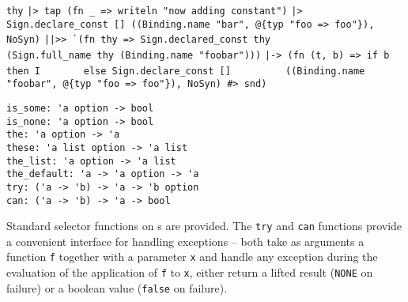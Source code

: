 \begin{isabellebody}
\begin{isamarkuptext}
  \smallskip\begin{mldecls}
\verb|thy|\isasep\isanewline%
\verb||\verb,|,\verb|> tap (fn _ => writeln "now adding constant")|\isasep\isanewline%
\verb||\verb,|,\verb|> Sign.declare_const [] ((Binding.name "bar", @{typ "foo => foo"}), NoSyn)|\isasep\isanewline%
\verb||\verb,|,\verb||\verb,|,\verb|>> `(fn thy => Sign.declared_const thy|\isasep\isanewline%
\verb|         (Sign.full_name thy (Binding.name "foobar")))|\isasep\isanewline%
\verb||\verb,|,\verb|-> (fn (t, b) => if b then I|\isasep\isanewline%
\verb|       else Sign.declare_const []|\isasep\isanewline%
\verb|         ((Binding.name "foobar", @{typ "foo => foo"}), NoSyn) #> snd)|\isasep\isanewline%

  \end{mldecls}%
\end{isamarkuptext}%
\isamarkuptrue%
%
\isamarkuptrue%
%
\isadelimmlref
%
\endisadelimmlref
%
\isatagmlref
%
\begin{isamarkuptext}%
\begin{mldecls}
  \verb|is_some: 'a option -> bool| \\
  \verb|is_none: 'a option -> bool| \\
  \verb|the: 'a option -> 'a| \\
  \verb|these: 'a list option -> 'a list| \\
  \verb|the_list: 'a option -> 'a list| \\
  \verb|the_default: 'a -> 'a option -> 'a| \\
  \verb|try: ('a -> 'b) -> 'a -> 'b option| \\
  \verb|can: ('a -> 'b) -> 'a -> bool| \\
  \end{mldecls}%
\end{isamarkuptext}%
\isamarkuptrue%
%
\endisatagmlref
{\isafoldmlref}%
%
\isadelimmlref
%
\endisadelimmlref
%
\begin{isamarkuptext}%
Standard selector functions on s are provided.  The
  \verb|try| and \verb|can| functions provide a convenient interface for
  handling exceptions -- both take as arguments a function \verb|f|
  together with a parameter \verb|x| and handle any exception during
  the evaluation of the application of \verb|f| to \verb|x|, either
  return a lifted result (\verb|NONE| on failure) or a boolean value
  (\verb|false| on failure).%

\end{isamarkuptext}
\end{isabellebody}
